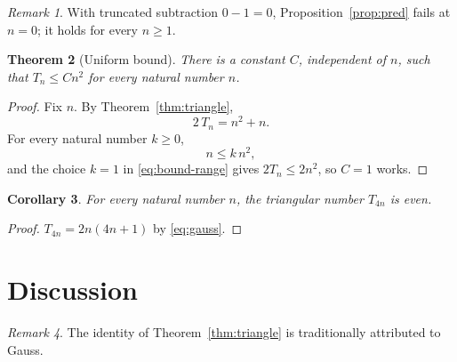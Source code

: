\documentclass[11pt]{article}
\newtheorem{theorem}{Theorem}[section]
\newtheorem{corollary}[theorem]{Corollary}
\theoremstyle{definition}
\theoremstyle{remark}
\newtheorem{remark}[theorem]{Remark}
\begin{document}
\begin{remark}\label{rem:pred}
With truncated subtraction $0 - 1 = 0$, Proposition~\ref{prop:pred} fails at $n = 0$; it holds
for every $n \ge 1$.
\end{remark}

\begin{theorem}[Uniform bound]\label{thm:bound}
There is a constant $C$, independent of $n$, such that $T_n \le C n^2$ for every natural number
$n$.
\end{theorem}

\begin{proof}
Fix $n$. By Theorem~\ref{thm:triangle},
\begin{equation}\label{eq:bound-sum}
  2\,T_n = n^2 + n.
\end{equation}
For every natural number $k \ge 0$,
\begin{equation}\label{eq:bound-range}
  n \le k\,n^2,
\end{equation}
and the choice $k = 1$ in \eqref{eq:bound-range} gives $2T_n \le 2n^2$, so $C = 1$ works.
\end{proof}

\begin{corollary}\label{cor:even-triangle}
For every natural number $n$, the triangular number $T_{4n}$ is even.
\end{corollary}

\begin{proof}
$T_{4n} = 2n(4n + 1)$ by \eqref{eq:gauss}.
\end{proof}

\section{Discussion}

\begin{remark}\label{rem:history}
The identity of Theorem~\ref{thm:triangle} is traditionally attributed to Gauss.
\end{remark}
\end{document}
